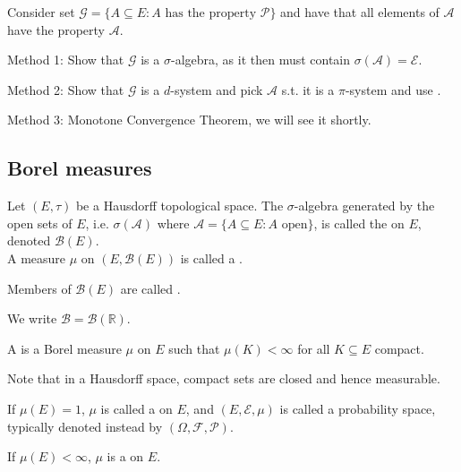 \begin{answer}
	Consider set $\mathcal{G} = \{A \subseteq E : A \text{ has the property } \mathcal{P}\}$ and have that all elements of $\mathcal{A}$ have the property $\mathcal{A}$.

	Method 1: Show that $\mathcal{G}$ is a $\sigma$-algebra, as it then must contain $\sigma(\mathcal{A}) = \mathcal{E}$.

	Method 2: Show that $\mathcal{G}$ is a $d$-system and pick $\mathcal{A}$ s.t. it is a $\pi$-system and use .

	Method 3: Monotone Convergence Theorem, we will see it shortly.
\end{answer}

\subsection{Borel measures}

\begin{definition}
	Let $(E, \tau)$ be a Hausdorff topological space.
	The $\sigma$-algebra generated by the open sets of $E$, i.e. $\sigma(\mathcal{A})$ where $\mathcal{A} = \{A \subseteq E : A \text{ open}\}$, is called the  on $E$, denoted $\mathcal B(E)$. \\
	A measure $\mu$ on $(E, \mathcal B(E))$ is called a .

	Members of $\mathcal B(E)$ are called .
\end{definition}

\begin{notation}
	We write $\mathcal B = \mathcal B(\mathbb R)$.
\end{notation}

\begin{definition}
	A  is a Borel measure $\mu$ on $E$ such that $\mu(K) < \infty$ for all $K \subseteq E$ compact.
\end{definition}
Note that in a Hausdorff space, compact sets are closed and hence measurable.

\begin{definition}
	If $\mu(E) = 1$, $\mu$ is called a  on $E$, and $(E, \mathcal{E}, \mu)$ is called a probability space, typically denoted instead by $(\Omega, \mathcal{F}, \mathcal{P})$.
\end{definition}

\begin{definition}
	If $\mu(E) < \infty$, $\mu$ is a  on $E$.
\end{definition}

